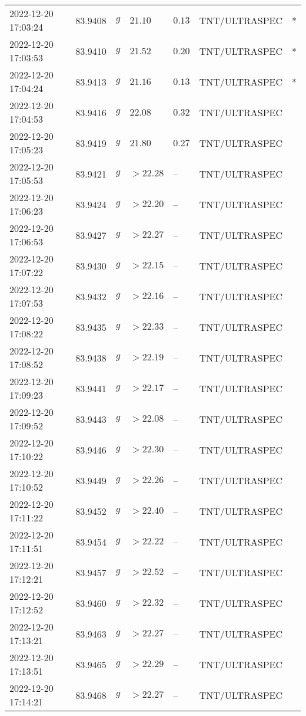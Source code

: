 \documentclass{nature_plusfigure}
\begin{document}
\begin{supplement}
\begin{center}
\begin{longtable}{lllllll}
2022-12-20 17:03:24 & 83.9408 & $g$ & $21.10$ & $0.13$ & TNT/ULTRASPEC & * \\ 
2022-12-20 17:03:53 & 83.9410 & $g$ & $21.52$ & $0.20$ & TNT/ULTRASPEC & * \\ 
2022-12-20 17:04:24 & 83.9413 & $g$ & $21.16$ & $0.13$ & TNT/ULTRASPEC & * \\ 
2022-12-20 17:04:53 & 83.9416 & $g$ & $22.08$ & $0.32$ & TNT/ULTRASPEC &  \\ 
2022-12-20 17:05:23 & 83.9419 & $g$ & $21.80$ & $0.27$ & TNT/ULTRASPEC &  \\ 
2022-12-20 17:05:53 & 83.9421 & $g$ & $>22.28$ & -- & TNT/ULTRASPEC &  \\ 
2022-12-20 17:06:23 & 83.9424 & $g$ & $>22.20$ & -- & TNT/ULTRASPEC &  \\ 
2022-12-20 17:06:53 & 83.9427 & $g$ & $>22.27$ & -- & TNT/ULTRASPEC &  \\ 
2022-12-20 17:07:22 & 83.9430 & $g$ & $>22.15$ & -- & TNT/ULTRASPEC &  \\ 
2022-12-20 17:07:53 & 83.9432 & $g$ & $>22.16$ & -- & TNT/ULTRASPEC &  \\ 
2022-12-20 17:08:22 & 83.9435 & $g$ & $>22.33$ & -- & TNT/ULTRASPEC &  \\ 
2022-12-20 17:08:52 & 83.9438 & $g$ & $>22.19$ & -- & TNT/ULTRASPEC &  \\ 
2022-12-20 17:09:23 & 83.9441 & $g$ & $>22.17$ & -- & TNT/ULTRASPEC &  \\ 
2022-12-20 17:09:52 & 83.9443 & $g$ & $>22.08$ & -- & TNT/ULTRASPEC &  \\ 
2022-12-20 17:10:22 & 83.9446 & $g$ & $>22.30$ & -- & TNT/ULTRASPEC &  \\ 
2022-12-20 17:10:52 & 83.9449 & $g$ & $>22.26$ & -- & TNT/ULTRASPEC &  \\ 
2022-12-20 17:11:22 & 83.9452 & $g$ & $>22.40$ & -- & TNT/ULTRASPEC &  \\ 
2022-12-20 17:11:51 & 83.9454 & $g$ & $>22.22$ & -- & TNT/ULTRASPEC &  \\ 
2022-12-20 17:12:21 & 83.9457 & $g$ & $>22.52$ & -- & TNT/ULTRASPEC &  \\ 
2022-12-20 17:12:52 & 83.9460 & $g$ & $>22.32$ & -- & TNT/ULTRASPEC &  \\ 
2022-12-20 17:13:21 & 83.9463 & $g$ & $>22.27$ & -- & TNT/ULTRASPEC &  \\ 
2022-12-20 17:13:51 & 83.9465 & $g$ & $>22.29$ & -- & TNT/ULTRASPEC &  \\ 
2022-12-20 17:14:21 & 83.9468 & $g$ & $>22.27$ & -- & TNT/ULTRASPEC &  \\ 

\end{longtable}
\end{center}
\end{supplement}
\end{document}
